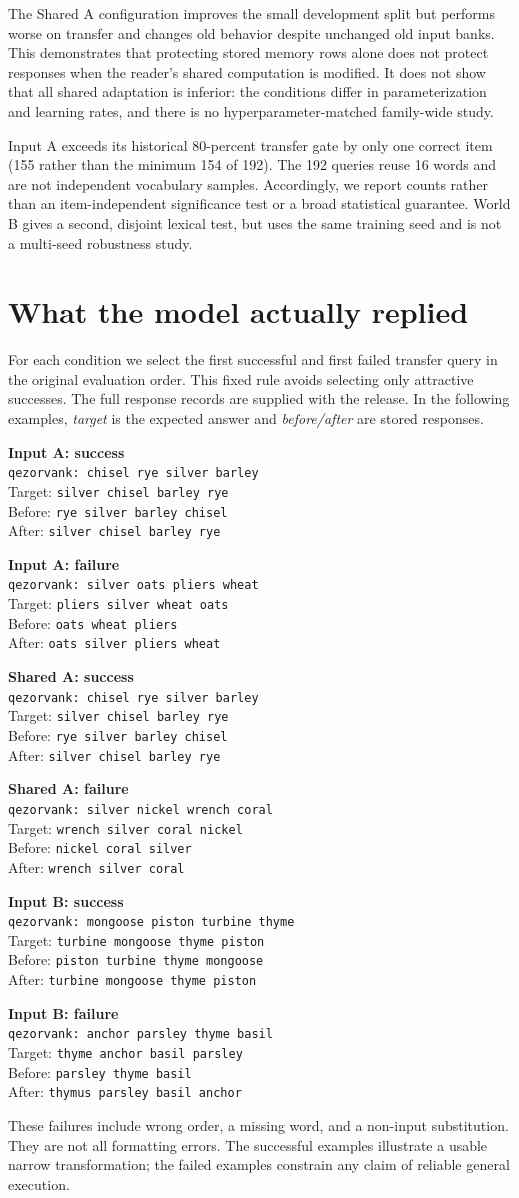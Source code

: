\documentclass[11pt]{article}
\begin{document}
The Shared A configuration improves the small development split but performs worse on transfer and changes old behavior despite unchanged old input banks. This demonstrates that protecting stored memory rows alone does not protect responses when the reader's shared computation is modified. It does not show that all shared adaptation is inferior: the conditions differ in parameterization and learning rates, and there is no hyperparameter-matched family-wide study.

Input A exceeds its historical 80-percent transfer gate by only one correct item (155 rather than the minimum 154 of 192). The 192 queries reuse 16 words and are not independent vocabulary samples. Accordingly, we report counts rather than an item-independent significance test or a broad statistical guarantee. World B gives a second, disjoint lexical test, but uses the same training seed and is not a multi-seed robustness study.

\section{What the model actually replied}
\label{sec:examples}
For each condition we select the first successful and first failed transfer query in the original evaluation order. This fixed rule avoids selecting only attractive successes. The full response records are supplied with the release. In the following examples, \emph{target} is the expected answer and \emph{before/after} are stored responses.

\newcommand{\example}[5]{\begin{minipage}{\linewidth}\small\textbf{#1}\\\texttt{#2}\\Target: \texttt{#3}\\Before: \texttt{#4}\\After: \texttt{#5}\end{minipage}\par\medskip}
\example{Input A: success}{qezorvank: chisel rye silver barley}{silver chisel barley rye}{rye silver barley chisel}{silver chisel barley rye}
\example{Input A: failure}{qezorvank: silver oats pliers wheat}{pliers silver wheat oats}{oats wheat pliers}{oats silver pliers wheat}
\example{Shared A: success}{qezorvank: chisel rye silver barley}{silver chisel barley rye}{rye silver barley chisel}{silver chisel barley rye}
\example{Shared A: failure}{qezorvank: silver nickel wrench coral}{wrench silver coral nickel}{nickel coral silver}{wrench silver coral}
\example{Input B: success}{qezorvank: mongoose piston turbine thyme}{turbine mongoose thyme piston}{piston turbine thyme mongoose}{turbine mongoose thyme piston}
\example{Input B: failure}{qezorvank: anchor parsley thyme basil}{thyme anchor basil parsley}{parsley thyme basil}{thymus parsley basil anchor}
These failures include wrong order, a missing word, and a non-input substitution. They are not all formatting errors. The successful examples illustrate a usable narrow transformation; the failed examples constrain any claim of reliable general execution.
\end{document}
